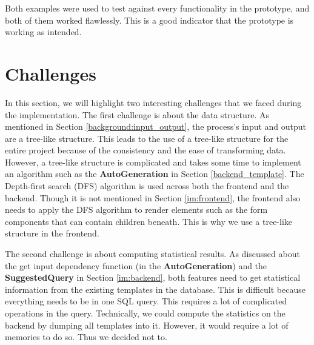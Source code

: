Both examples were used to test against every functionality in the prototype, and both of them worked flawlessly. This is a good indicator that the prototype is working as intended.


\section{Challenges}

In this section, we will highlight two interesting challenges that we faced during the implementation. The first challenge is about the data structure. As mentioned in Section \ref{background:input_output}, the process's input and output are a tree-like structure. This leads to the use of a tree-like structure for the entire project because of the consistency and the ease of transforming data. However, a tree-like structure is complicated and takes some time to implement an algorithm such as the \textbf{AutoGeneration} in Section \ref{backend_template}. The Depth-first search (DFS) algorithm \cite{dfs} is used across both the frontend and the backend. Though it is not mentioned in Section \ref{im:frontend}, the frontend also needs to apply the DFS algorithm to render elements such as the form components that can contain children beneath.
This is why we use a tree-like structure in the frontend.

The second challenge is about computing statistical results. As discussed about the get input dependency function (in the \textbf{AutoGeneration}) and the \textbf{SuggestedQuery} in Section \ref{im:backend}, both features need to get statistical information from the existing templates in the database.
This is difficult because everything needs to be in one SQL query. This requires a lot of complicated operations in the query.
Technically, we could compute the statistics on the backend by dumping all templates into it.
However, it would require a lot of memories to do so. Thus we decided not to.



